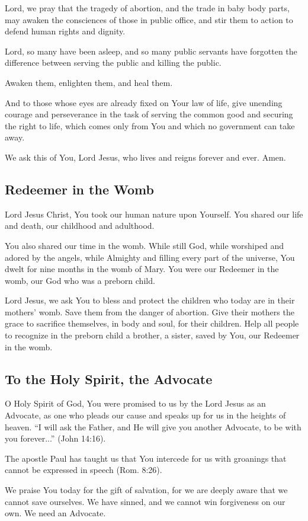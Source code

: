 \documentclass[12pt]{article}
\newcommand{\prayertitle}[1]{\subsection{#1}}
\begin{document}
Lord, we pray that the tragedy of abortion, and the trade in baby body parts, may awaken the consciences of those in public office, and stir them to action to defend human rights and dignity.

Lord, so many have been asleep, and so many public servants have forgotten the difference between serving the public and killing the public.

Awaken them, enlighten them, and heal them.

And to those whose eyes are already fixed on Your law of life, give unending courage and perseverance in the task of serving the common good and securing the right to life, which comes only from You and which no government can take away.

We ask this of You, Lord Jesus, who lives and reigns forever and ever. Amen.

\prayertitle{Redeemer in the Womb}
Lord Jesus Christ, You took our human nature upon Yourself.
You shared our life and death, our childhood and adulthood.

You also shared our time in the womb. While still God, while worshiped and adored by the angels, while Almighty and filling every part of the universe, You dwelt for nine months in the womb of Mary.
You were our Redeemer in the womb, our God who was a preborn child.

Lord Jesus, we ask You to bless and protect the children who today are in their mothers' womb.
Save them from the danger of abortion.
Give their mothers the grace to sacrifice themselves, in body and soul, for their children.
Help all people to recognize in the preborn child a brother, a sister, saved by You, our Redeemer in the womb.

\prayertitle{To the Holy Spirit, the Advocate}
O Holy Spirit of God, You were promised to us by the Lord Jesus as an Advocate, as one who pleads our cause and speaks up for us in the heights of heaven.
``I will ask the Father, and He will give you another Advocate, to be with you forever...'' (John 14:16).

The apostle Paul has taught us that You intercede for us with groanings that cannot be expressed in speech (Rom. 8:26).

We praise You today for the gift of salvation, for we are deeply aware that we cannot save ourselves.
We have sinned, and we cannot win forgiveness on our own.
We need an Advocate.
\end{document}
